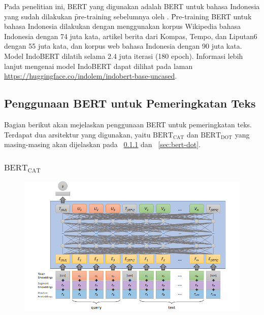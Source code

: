 	Pada penelitian ini, BERT yang digunakan adalah BERT untuk bahasa Indonesia yang sudah dilakukan \f{pre-training} sebelumnya oleh \cite{indobert}. \f{Pre-training} BERT untuk bahasa Indonesia dilakukan dengan menggunakan korpus Wikipedia bahasa Indonesia dengan 74 juta kata, artikel berita dari Kompas, Tempo, dan Liputan6 dengan 55 juta kata, dan korpus web bahasa Indonesia dengan 90 juta kata. Model IndoBERT dilatih selama 2.4 juta iterasi (180 epoch). Informasi lebih lanjut mengenai model IndoBERT dapat dilihat pada laman \url{https://huggingface.co/indolem/indobert-base-uncased}.


	\subsection{Penggunaan BERT untuk Pemeringkatan Teks}
	Bagian berikut akan mejelaskan penggunaan BERT untuk pemeringkatan teks. Terdapat dua arsitektur yang digunakan, yaitu $\text{BERT}_{\text{CAT}}$ dan $\text{BERT}_{\text{DOT}}$ yang masing-masing akan dijelaskan pada \sect~\ref{sec:bert-cat} dan \sect~\ref{sec:bert-dot}.

	\subsubsection{$\text{BERT}_{\text{CAT}}$}
		\label{sec:bert-cat}

		\begin{figure}[!ht]
			\centering
			\includegraphics[width=1\textwidth]{assets/pics/bertcat.png}
			\label{fig:bert-cat}
		\end{figure}

